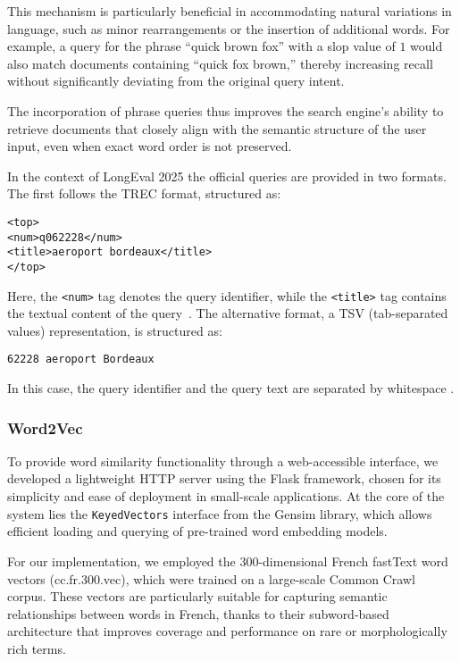 This mechanism is particularly beneficial in accommodating natural variations in language, such as minor rearrangements or the insertion of additional words. For example, a query for the phrase ``quick brown fox'' with a slop value of $1$ would also match documents containing ``quick fox brown,'' thereby increasing recall without significantly deviating from the original query intent.

The incorporation of phrase queries thus improves the search engine’s ability to retrieve documents that closely align with the semantic structure of the user input, even when exact word order is not preserved.

In the context of LongEval 2025 \cite{longeval2025} the official queries are provided in two formats. The first follows the TREC format, structured as:

\begin{verbatim}
<top>
<num>q062228</num>
<title>aeroport bordeaux</title>
</top>
\end{verbatim}

Here, the \texttt{<num>} tag denotes the query identifier, while the \texttt{<title>} tag contains the textual content of the query~\cite{reference5}. The alternative format, a TSV (tab-separated values) representation, is structured as:

\begin{verbatim}
62228 aeroport Bordeaux
\end{verbatim}

In this case, the query identifier and the query text are separated by whitespace \cite{longeval2025readme}.

\subsubsection{Word2Vec}
\label{subsubsec: Word2Vec}
To provide word similarity functionality through a web-accessible interface, we developed a lightweight HTTP server using the Flask framework, chosen for its simplicity and ease of deployment in small-scale applications. At the core of the system lies the \texttt{KeyedVectors} interface from the Gensim library, which allows efficient loading and querying of pre-trained word embedding models.

For our implementation, we employed the 300-dimensional French fastText word vectors (cc.fr.300.vec), which were trained on a large-scale Common Crawl corpus. These vectors are particularly suitable for capturing semantic relationships between words in French, thanks to their subword-based architecture that improves coverage and performance on rare or morphologically rich terms.

